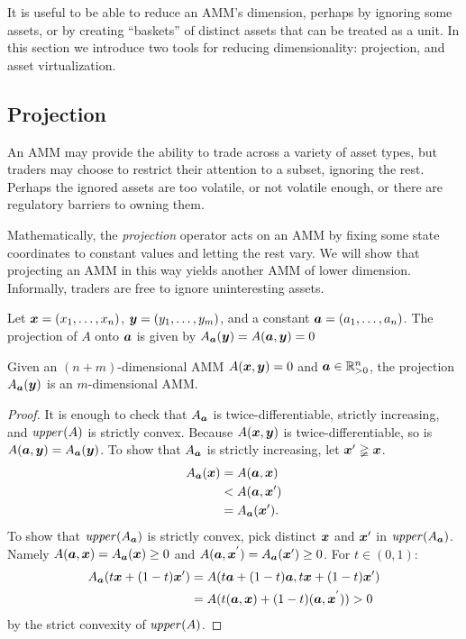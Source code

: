 It is useful to be able to reduce an AMM's dimension,
perhaps by ignoring some assets,
or by creating ``baskets'' of distinct assets that can
be treated as a unit.
In this section we introduce two tools for reducing dimensionality:
projection, and asset virtualization.

\subsection{Projection}
An AMM may provide the ability to trade across a variety of asset types,
but traders may choose to restrict their attention to a subset,
ignoring the rest.
Perhaps the ignored assets are too volatile, or not volatile enough,
or there are regulatory barriers to owning them.

Mathematically,
the \emph{projection} operator acts on an AMM by fixing some
state coordinates to constant values and letting the rest vary.
We will show that projecting an AMM in this way yields another AMM
of lower dimension.
Informally, traders are free to ignore uninteresting assets.
\begin{definition}
  Let ${\boldsymbol x} = (x_1, \ldots, x_n)$, ${\boldsymbol y} = (y_1, \ldots, y_m)$,
  and a constant ${\boldsymbol a} = (a_1, \ldots, a_n)$.
  The projection of $A$ onto ${\boldsymbol a}$ is given by
  $A_{{\boldsymbol a}}({\boldsymbol y}) = A({\boldsymbol a}, {\boldsymbol y}) = 0$
\end{definition}
\begin{lemma}
  Given an $(n+m)$-dimensional AMM $A({\boldsymbol x},{\boldsymbol y}) = 0$ and ${\boldsymbol a} \in \mathbb{R}_{>0}^n$,
  the projection $A_{{\boldsymbol a}}({\boldsymbol y})$ is an $m$-dimensional AMM.
\end{lemma}
\begin{proof}
  It is enough to check that $A_{{\boldsymbol a}}$ is twice-differentiable,
  strictly increasing, and $\mathit{upper}(A)$ is strictly convex.
  Because $A({\boldsymbol x},{\boldsymbol y})$ is twice-differentiable,
  so is $A({\boldsymbol a},{\boldsymbol y}) = A_{{\boldsymbol a}}({\boldsymbol y})$.
  To show that $A_{{\boldsymbol a}}$ is strictly increasing,
  let ${\boldsymbol x}' \gneqq {\boldsymbol x}$.
  \begin{align*}
    A_{{\boldsymbol a}}({\boldsymbol x})
    &= A({\boldsymbol a},{\boldsymbol x})\\
    &< A({\boldsymbol a},{\boldsymbol x}')\\
    &= A_{{\boldsymbol a}}({\boldsymbol x}').
  \end{align*}
  To show that $\mathit{upper}(A_{{\boldsymbol a}})$ is strictly convex,
  pick distinct ${\boldsymbol x}$ and ${\boldsymbol x}'$ in $\mathit{upper}(A_{{\boldsymbol a}})$.
  Namely $A({\boldsymbol a},{\boldsymbol x}) = A_{{\boldsymbol a}}({\boldsymbol x}) \geq 0$ and $ A({\boldsymbol a},{\boldsymbol x}^{'}) = A_{{\boldsymbol a}}({\boldsymbol x}') \geq 0$.
  For $t \in (0,1)$:
  \begin{align*}
    A_{{\boldsymbol a}}(t {\boldsymbol x} + (1-t) {\boldsymbol x}')
    &= A(t {\boldsymbol a} + (1-t) {\boldsymbol a}, t {\boldsymbol x} + (1-t) {\boldsymbol x}')\\
    &= A(t({\boldsymbol a},{\boldsymbol x}) + (1-t)({\boldsymbol a},{\boldsymbol x}^{'})) > 0
  \end{align*}
  by the strict convexity of $\mathit{upper}(A)$.
\end{proof}

